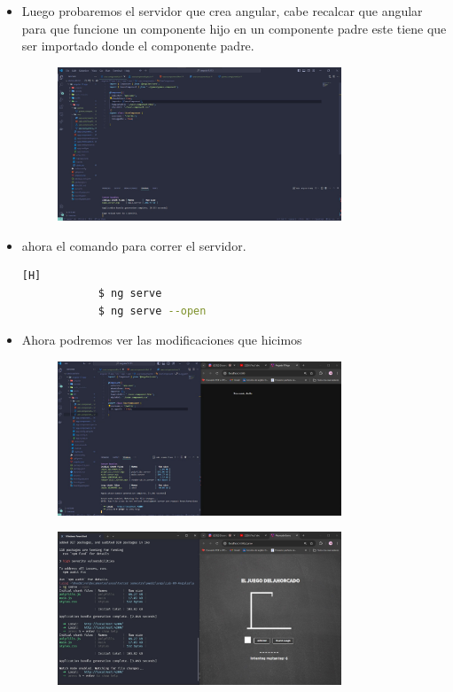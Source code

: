 \documentclass{article}
\begin{document}
\begin{itemize}
\begin{figure}[H]
		\end{figure}
		\item Luego probaremos el servidor que crea angular, cabe recalcar que angular para que funcione un componente hijo en un componente padre este tiene que ser importado donde el componente padre.
		\begin{figure}[H]
			\centering
			\includegraphics[width=0.8\textwidth,keepaspectratio]{img/tenemosqueimportarparausarloenotrocomponente.jpg}
	
		\end{figure}
		\item ahora el comando para correr el servidor.
		\begin{lstlisting}[language=bash,caption={Comandos del servidor}][H]
			$ ng serve
			$ ng serve --open
		\end{lstlisting}
		\item Ahora podremos ver las modificaciones que hicimos
		\begin{figure}[H]
			\centering
			\includegraphics[width=0.8\textwidth,keepaspectratio]{img/servidorInicio.jpg}
	
		\end{figure}
		\begin{figure}[H]
			\centering
			\includegraphics[width=0.8\textwidth,keepaspectratio]{img/iniciamos el servidor.jpg}
	

\end{figure}
\end{itemize}
\end{document}

